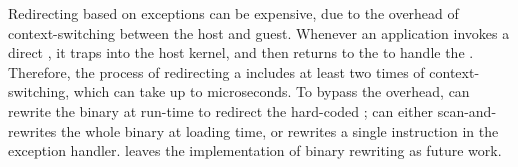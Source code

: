 Redirecting \linuxapis{} based on exceptions
can be expensive,
due to the overhead of context-switching between the host and guest.
Whenever an application invokes a direct \linuxapi{},
it traps into the host kernel, and then returns to the \libos{} to handle the \linuxapi{}.
Therefore, the process of redirecting a \linuxapi{} includes at least two times of context-switching, which can take up to microseconds.
To bypass the overhead,
\thelibos{} can 
rewrite the binary at run-time to redirect the hard-coded \linuxapis{};
\thelibos{} can
either scan-and-rewrites the whole binary at loading time,
or rewrites a single  instruction in the exception handler.
\graphene{} leaves the implementation of binary rewriting
as future work.


